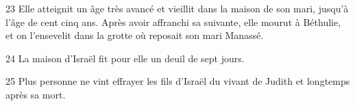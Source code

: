 
23 Elle atteignit un âge très avancé et vieillit dans la maison de son mari, jusqu'à l'âge de cent cinq ans. Après avoir affranchi sa suivante, elle mourut à Béthulie, et on l'ensevelit dans la grotte où reposait son mari Manassé.

24 La maison d'Israël fit pour elle un deuil de sept jours.

25 Plus personne ne vint effrayer les fils d'Israël du vivant de Judith et longtemps après sa mort.